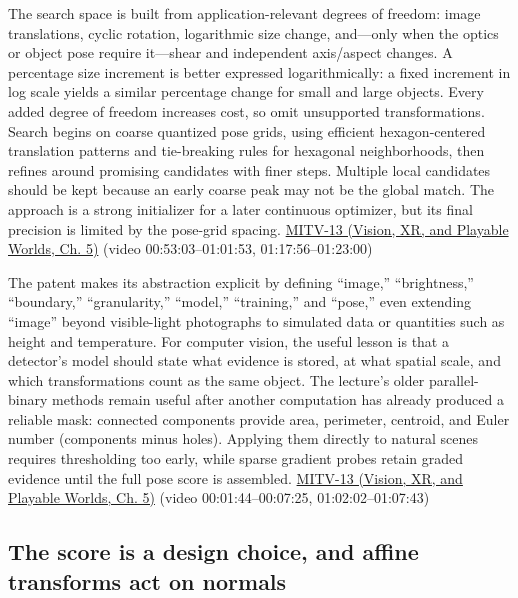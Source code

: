 The search space is built from application-relevant degrees of freedom: image translations, cyclic rotation, logarithmic size change, and---only when the optics or object pose require it---shear and independent axis/aspect changes. A percentage size increment is better expressed logarithmically: a fixed increment in log scale yields a similar percentage change for small and large objects. Every added degree of freedom increases cost, so omit unsupported transformations. Search begins on coarse quantized pose grids, using efficient hexagon-centered translation patterns and tie-breaking rules for hexagonal neighborhoods, then refines around promising candidates with finer steps. Multiple local candidates should be kept because an early coarse peak may not be the global match. The approach is a strong initializer for a later continuous optimizer, but its final precision is limited by the pose-grid spacing. \href{../07-Vision-XR-and-Playable-Worlds/main.pdf\#nameddest=04-visual-computing-ii-ch036-mitv-13---object-detection-recognition-and-pose-determination-patquick-us-7016539}{MITV-13 (Vision, XR, and Playable Worlds, Ch. 5)} (video 00:53:03--01:01:53, 01:17:56--01:23:00)

The patent makes its abstraction explicit by defining ``image,'' ``brightness,'' ``boundary,'' ``granularity,'' ``model,'' ``training,'' and ``pose,'' even extending ``image'' beyond visible-light photographs to simulated data or quantities such as height and temperature. For computer vision, the useful lesson is that a detector's model should state what evidence is stored, at what spatial scale, and which transformations count as the same object. The lecture's older parallel-binary methods remain useful after another computation has already produced a reliable mask: connected components provide area, perimeter, centroid, and Euler number (components minus holes). Applying them directly to natural scenes requires thresholding too early, while sparse gradient probes retain graded evidence until the full pose score is assembled. \href{../07-Vision-XR-and-Playable-Worlds/main.pdf\#nameddest=04-visual-computing-ii-ch036-mitv-13---object-detection-recognition-and-pose-determination-patquick-us-7016539}{MITV-13 (Vision, XR, and Playable Worlds, Ch. 5)} (video 00:01:44--00:07:25, 01:02:02--01:07:43)

\subsection{The score is a design choice, and affine transforms act on normals}\label{04-visual-computing-ii-ch030-the-score-is-a-design-choice-and-affine-transforms-act-on-normals}

